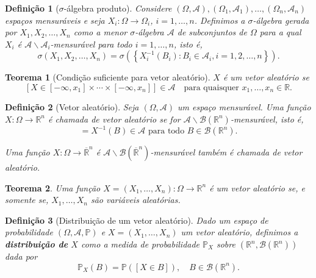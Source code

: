 \documentclass[12pt,a4paper,answers]{article}
\numberwithin{equation}{section} %
\renewcommand{\Re}{\mathbb{R}}
\newcommand{\Acal}{\mathcal{A}}
\newcommand{\sig}{$\sigma$}
\theoremstyle{thm_estilo}
\newtheorem{theorem}{Teorema}[section]
\newtheorem{definition}{Definição}[section]
\theoremstyle{thm_note_est}
\begin{document}
\begin{definition}[\sig-álgebra produto] 
	Considere $(\Omega, \mathcal{A}), (\Omega_1, \mathcal{A}_1), \ldots, (\Omega_n, \mathcal{A}_n)$ espaços mensuráveis e seja $X_i: \Omega \rightarrow \Omega_i$, $i = 1, \ldots, n$. Definimos a $\sigma$-álgebra gerada por $X_1, X_2, \ldots, X_n$ como a menor $\sigma$-álgebra $\mathcal{A}$ de subconjuntos de $\Omega$ para a qual $X_i$ é $\mathcal{A}\backslash\mathcal{A}_i$-mensurável para todo $i = 1, \ldots, n$, isto é,
	\begin{equation}
		\sigma(X_1, X_2, \ldots, X_n) = \sigma\left(\left\{X_i^{-1}(B_i) : B_i \in \mathcal{A}_i, i = 1, 2, \ldots, n\right\}\right).
	\end{equation}
\end{definition}

\begin{theorem}[Condição suficiente para vetor aleatório]
	$X$ é um vetor aleatório se
	\begin{equation}
		\left[X \in [-\infty,x_1]\times\cdots\times[-\infty,x_n]\right] \in \Acal \quad \text{para quaisquer } x_1,\ldots,x_n \in \Re.
	\end{equation}
\end{theorem}

\begin{definition}[Vetor aleatório]
	Seja $(\Omega, \mathcal{A})$ um espaço mensurável. Uma função $X : \Omega \rightarrow \mathbb{R}^n$ é chamada de \textit{vetor aleatório} se for $\mathcal{A}\backslash\mathcal{B}(\mathbb{R}^n)$-mensurável, isto é,
	\begin{equation}
		 [X \in B] = X^{-1}(B) \in \mathcal{A} \text{ para todo } B \in 	\mathcal{B}(\mathbb{R}^n).
	 \end{equation}

	Uma função $X : \Omega \rightarrow \overline{\mathbb{R}}^n$ é $\mathcal{A}\backslash\mathcal{B}(\overline{\mathbb{R}}^n)$-mensurável também é chamada de vetor aleatório.
\end{definition}

\begin{theorem}
	Uma função $X = (X_1, \ldots, X_n) : \Omega \rightarrow \mathbb{R}^n$ é um vetor aleatório se, e somente se, $X_1, \ldots, X_n$ são variáveis aleatórias.
\end{theorem}

\begin{definition}[Distribuição de um vetor aleatório]
	Dado um espaço de probabilidade $(\Omega, \mathcal{A}, \mathbb{P})$ e $X = (X_1, \ldots, X_n)$ um vetor aleatório, definimos a \textbf{distribuição de} $X$ como a medida de probabilidade $\mathbb{P}_X$ sobre $\left(\mathbb{R}^n, \mathcal{B}(\mathbb{R}^n)\right)$ dada por
	\begin{equation}
		\mathbb{P}_X(B) = \mathbb{P}\left([X \in B]\right), \quad B \in \mathcal{B}(\mathbb{R}^n).
	\end{equation}
\end{definition}
\end{document}
